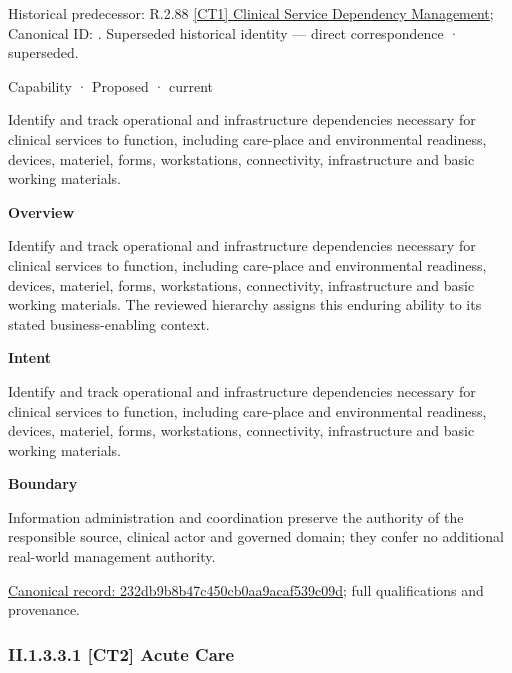 {\small Historical predecessor: R.2.88 \hyperref[element:984ee17123eb4f92b3e55e55d24459b8]{[CT1] Clinical Service Dependency Management}; Canonical ID: \texttt{}. Superseded historical identity — direct correspondence · superseded.}\par
\label{element:232db9b8b47c450cb0aa9acaf539c09d}
{\small Capability · Proposed · current}\par

Identify and track operational and infrastructure dependencies necessary for clinical services to function, including care-place and environmental readiness, devices, materiel, forms, workstations, connectivity, infrastructure and basic working materials.



\textbf{Overview}



Identify and track operational and infrastructure dependencies necessary for clinical services to function, including care-place and environmental readiness, devices, materiel, forms, workstations, connectivity, infrastructure and basic working materials. The reviewed hierarchy assigns this enduring ability to its stated business-enabling context.



\textbf{Intent}



Identify and track operational and infrastructure dependencies necessary for clinical services to function, including care-place and environmental readiness, devices, materiel, forms, workstations, connectivity, infrastructure and basic working materials.



\textbf{Boundary}



Information administration and coordination preserve the authority of the responsible source, clinical actor and governed domain; they confer no additional real-world management authority.


{\footnotesize \href{../../../../continuum/strategy/capability/232db9b8b47c450cb0aa9acaf539c09d.md}{Canonical record: 232db9b8b47c450cb0aa9acaf539c09d}; full qualifications and provenance.}\par
\subsubsection*{II.1.3.3.1 [CT2] Acute Care}
\label{navigation:II.1.3.3.1}

